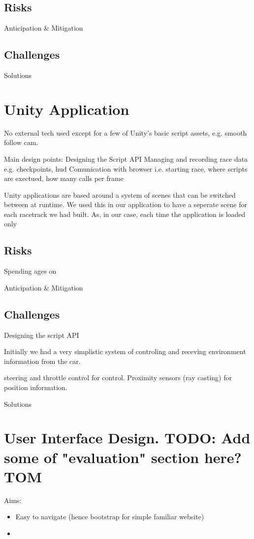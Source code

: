 \subsection{Risks}
Anticipation \& Mitigation

\subsection{Challenges}
Solutions

\section{Unity Application}
No external tech used except for a few of Unity's basic script assets, e.g. smooth follow cam.

Main design points:
Designing the Script API
Managing and recording race data e.g. checkpoints, hud
Comunication with browser i.e. starting race, where scripts are exectued, how many calls per frame

Unity applications are based around a system of scenes that can be switched between at runtime. We used this in our application to have a seperate scene for each racetrack we had built. As, in our case, each time the application is loaded only 

\subsection{Risks}
Spending ages on 

Anticipation \& Mitigation

\subsection{Challenges}
Designing the script API

Initially we had a very simplistic system of controling and receving environment information from the car. 

steering and throttle control for control. Proximity sensors (ray casting) for position information. 

Solutions

\section{User Interface Design. TODO: Add some of "evaluation" section here? {\color{red} TOM}}
Aims:
\begin{itemize}
\item Easy to navigate (hence bootstrap for simple familiar website) 
\item 
\end{itemize}



